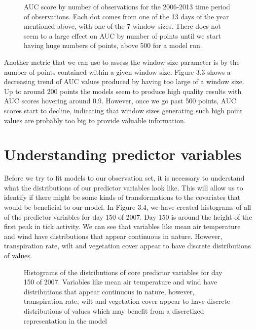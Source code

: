 \begin{figure} [!ht]
\centerline{}
\caption{AUC score by number of observations for the 2006-2013 time period of observations. Each dot comes from one of the 13 days of the year mentioned above, with one of the 7 window sizes. There does not seem to a large effect on AUC by number of points until we start having huge numbers of points, above 500 for a model run.  }
\label{fig6}
\end{figure}

\noindent Another metric that we can use to assess the window size parameter is by the number of points contained within a given window size. Figure 3.3 shows a decreasing trend of AUC values produced by having too large of a window size. Up to around 200 points the models seem to produce high quality results with AUC scores hovering around 0.9. However, once we go past 500 points, AUC scores start to decline, indicating that window sizes generating such high point values are probably too big to provide valuable information.  \newline



\section{Understanding predictor variables}

Before we try to fit models to our observation set, it is necessary to understand what the distributions of our predictor variables look like. This will allow us to identify if there might be some kinds of transformations to the covariates that would be beneficial to our model. In Figure 3.4, we have created histograms of all of the predictor variables for day 150 of 2007. Day 150 is around the height of the first peak in tick activity. We can see that variables like mean air temperature and wind have distributions that appear continuous in nature. However, transpiration rate, wilt and vegetation cover appear to have discrete distributions of values. \newline

\begin{figure} [!ht]
\centerline{}
\caption{Histograms of the distributions of core predictor  variables for day 150 of 2007. Variables like mean air temperature and wind have distributions that appear continuous in nature, however, transpiration rate, wilt and vegetation cover appear to have discrete distributions of values which may benefit from a discretized representation in the model }
\label{fig6}
\end{figure}

